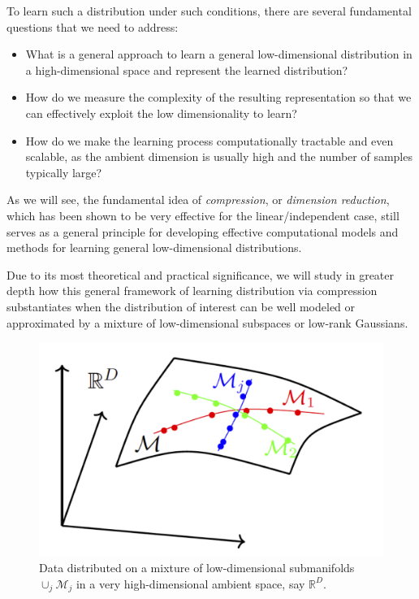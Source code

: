 \documentclass[../../book-main.tex]{subfiles}
\begin{document}
To learn such a distribution under such conditions, there are several fundamental questions that we need to address:
\begin{itemize}
	\item What is a general approach to learn a general low-dimensional distribution in a high-dimensional space and represent the learned distribution?
	\item How do we measure the complexity of the resulting representation so that we can effectively exploit the low dimensionality to learn?
	\item How do we make the learning process computationally tractable and even scalable, as the ambient dimension is usually high and the number of samples typically large?
\end{itemize}
As we will see, the fundamental idea of {\em compression}, or {\em dimension reduction}, which has been shown to be very effective for the linear/independent case, still serves as a general principle for developing effective computational models and methods for learning general low-dimensional distributions.

Due to its most theoretical and practical significance, we will study in greater depth how this general framework of learning distribution via compression substantiates when the distribution of interest can be well modeled or approximated by a mixture of low-dimensional subspaces or low-rank Gaussians.

\begin{figure}
    \centering
    \includegraphics[width=0.5\linewidth]{chapters/chapter3/figs/mixed-manifolds.png}
    \caption{Data distributed on a mixture of low-dimensional submanifolds $\cup_j \mathcal{M}_j$ in a very high-dimensional ambient space, say $\mathbb{R}^D$.}
    \label{fig:mixture-manifolds}
\end{figure}
\end{document}

